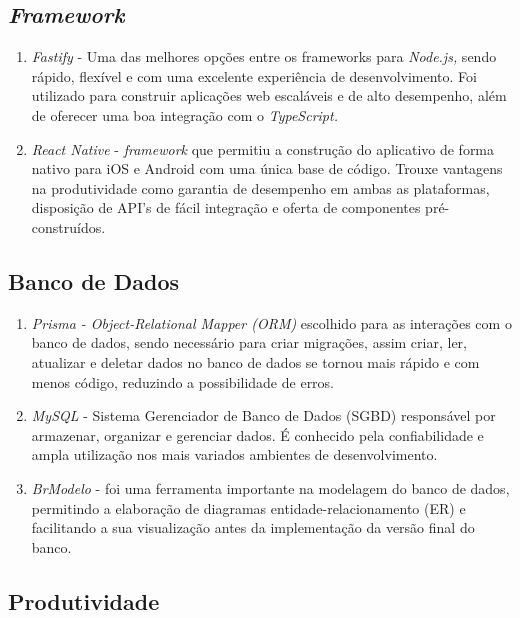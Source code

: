 \subsection{\textit{Framework}}

\begin{enumerate}
	\item\textit{Fastify} - Uma das melhores opções entre os frameworks para \textit{Node.js,} sendo rápido, flexível e com uma excelente experiência de desenvolvimento. Foi utilizado para construir aplicações web escaláveis e de alto desempenho, além de oferecer uma boa integração com o \textit{TypeScript.} 
	\item \textit{React Native} - \textit{framework} que permitiu a construção do aplicativo de forma nativo para iOS e Android com uma única base de código. Trouxe vantagens na produtividade como garantia de desempenho em ambas as plataformas, disposição de API's de fácil integração e oferta de componentes pré-construídos.
\end{enumerate}

\subsection{Banco de Dados}

\begin{enumerate}

	\item \textit{Prisma - Object-Relational Mapper (ORM)} escolhido para as interações com o banco de dados, sendo necessário para criar migrações, assim criar, ler, atualizar e deletar dados no banco de dados se tornou mais rápido e com menos código, reduzindo a possibilidade de erros.
	
	\item \textit{MySQL} - Sistema Gerenciador de Banco de Dados (SGBD) responsável por armazenar, organizar e gerenciar dados. É conhecido pela confiabilidade e ampla utilização nos mais variados ambientes de desenvolvimento.
	
	\item \textit{BrModelo} -  foi uma ferramenta importante na modelagem do banco de dados, permitindo a elaboração de diagramas entidade-relacionamento (ER) e facilitando a sua visualização antes da implementação da versão final do banco.
	
\end{enumerate}

\subsection{Produtividade}


